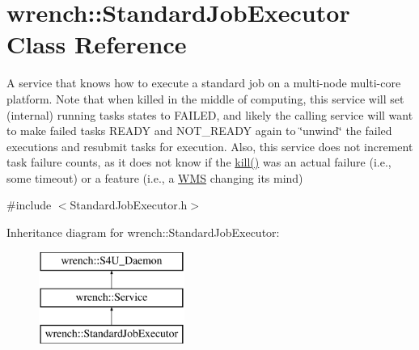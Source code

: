 \hypertarget{classwrench_1_1_standard_job_executor}{}\section{wrench\+:\+:Standard\+Job\+Executor Class Reference}
\label{classwrench_1_1_standard_job_executor}


A service that knows how to execute a standard job on a multi-\/node multi-\/core platform. Note that when killed in the middle of computing, this service will set (internal) running tasks\textquotesingle{} states to F\+A\+I\+L\+ED, and likely the calling service will want to make failed tasks R\+E\+A\+DY and N\+O\+T\+\_\+\+R\+E\+A\+DY again to \char`\"{}unwind\char`\"{} the failed executions and resubmit tasks for execution. Also, this service does not increment task failure counts, as it does not know if the \hyperlink{classwrench_1_1_standard_job_executor_aec6a1864dacefd357399bc058e3ae08f}{kill()} was an actual failure (i.\+e., some timeout) or a feature (i.\+e., a \hyperlink{classwrench_1_1_w_m_s}{W\+MS} changing its mind)  




{\ttfamily \#include $<$Standard\+Job\+Executor.\+h$>$}

Inheritance diagram for wrench\+:\+:Standard\+Job\+Executor\+:\begin{figure}[H]
\begin{center}
\leavevmode
\includegraphics[height=3.000000cm]{classwrench_1_1_standard_job_executor}
\end{center}
\end{figure}
